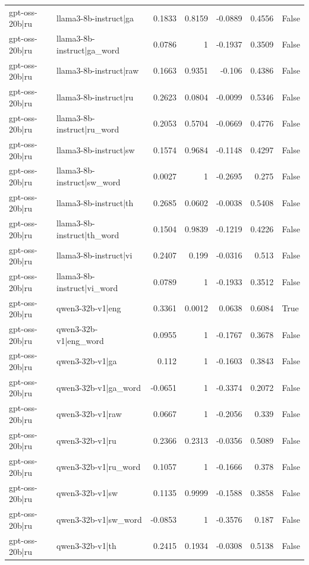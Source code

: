 \begin{table}
\begin{tabular}{l l r r r r l}
gpt-oss-20b|ru & llama3-8b-instruct|ga & 0.1833 & 0.8159 & -0.0889 & 0.4556 & False \\
gpt-oss-20b|ru & llama3-8b-instruct|ga_word & 0.0786 & 1 & -0.1937 & 0.3509 & False \\
gpt-oss-20b|ru & llama3-8b-instruct|raw & 0.1663 & 0.9351 & -0.106 & 0.4386 & False \\
gpt-oss-20b|ru & llama3-8b-instruct|ru & 0.2623 & 0.0804 & -0.0099 & 0.5346 & False \\
gpt-oss-20b|ru & llama3-8b-instruct|ru_word & 0.2053 & 0.5704 & -0.0669 & 0.4776 & False \\
gpt-oss-20b|ru & llama3-8b-instruct|sw & 0.1574 & 0.9684 & -0.1148 & 0.4297 & False \\
gpt-oss-20b|ru & llama3-8b-instruct|sw_word & 0.0027 & 1 & -0.2695 & 0.275 & False \\
gpt-oss-20b|ru & llama3-8b-instruct|th & 0.2685 & 0.0602 & -0.0038 & 0.5408 & False \\
gpt-oss-20b|ru & llama3-8b-instruct|th_word & 0.1504 & 0.9839 & -0.1219 & 0.4226 & False \\
gpt-oss-20b|ru & llama3-8b-instruct|vi & 0.2407 & 0.199 & -0.0316 & 0.513 & False \\
gpt-oss-20b|ru & llama3-8b-instruct|vi_word & 0.0789 & 1 & -0.1933 & 0.3512 & False \\
gpt-oss-20b|ru & qwen3-32b-v1|eng & 0.3361 & 0.0012 & 0.0638 & 0.6084 & True \\
gpt-oss-20b|ru & qwen3-32b-v1|eng_word & 0.0955 & 1 & -0.1767 & 0.3678 & False \\
gpt-oss-20b|ru & qwen3-32b-v1|ga & 0.112 & 1 & -0.1603 & 0.3843 & False \\
gpt-oss-20b|ru & qwen3-32b-v1|ga_word & -0.0651 & 1 & -0.3374 & 0.2072 & False \\
gpt-oss-20b|ru & qwen3-32b-v1|raw & 0.0667 & 1 & -0.2056 & 0.339 & False \\
gpt-oss-20b|ru & qwen3-32b-v1|ru & 0.2366 & 0.2313 & -0.0356 & 0.5089 & False \\
gpt-oss-20b|ru & qwen3-32b-v1|ru_word & 0.1057 & 1 & -0.1666 & 0.378 & False \\
gpt-oss-20b|ru & qwen3-32b-v1|sw & 0.1135 & 0.9999 & -0.1588 & 0.3858 & False \\
gpt-oss-20b|ru & qwen3-32b-v1|sw_word & -0.0853 & 1 & -0.3576 & 0.187 & False \\
gpt-oss-20b|ru & qwen3-32b-v1|th & 0.2415 & 0.1934 & -0.0308 & 0.5138 & False \\

\end{tabular}
\end{table}
